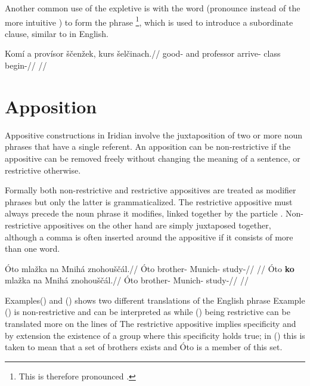 Another common use of the expletive  is with the word  (pronounce  instead of the more intuitive ) to form the phrase \footnote{This is therefore pronounced .}, which is used to introduce a subordinate clause, similar to  in English.

\pex
\a\begingl
    \gla Kom\'i a prov\'isor \v{s}\v{c}en\v{z}ek, kurs \v{s}el\v{c}inach.//
    \glb good- and professor arrive- class begin-//
    \glft {}//
\endgl
\xe

\section{Apposition}\label{sec:apposition}

Appositive constructions in Iridian involve the juxtaposition of two or more noun phrases that have a single referent. An apposition can be non-restrictive if the appositive can be removed freely without changing the meaning of a sentence, or restrictive otherwise.

Formally both non-restrictive and restrictive appositives are treated as modifier phrases but only the latter is grammaticalized. The restrictive appositive must always precede the noun phrase it modifies, linked together by the particle . Non-restrictive appositives on the other hand are simply juxtaposed together, although a comma is often inserted around the appositive if it consists of more than one word.

\pex\a
\begingl{}
    \gla \'Oto mla\v{z}ka na Mnih\'a znohou\v{s}\v{c}\'al.//
    \glb  \'Oto brother-  Munich- study-//
    \glft {}//
\endgl
\a\begingl{}
    \gla \'Oto \textbf{ko} mla\v{z}ka na Mnih\'a znohou\v{s}\v{c}\'al.//
    \glb  \'Oto  brother-  Munich- study-//
    \glft {}//
\endgl
\xe

Examples() and () shows two different translations of the English phrase  Example () is non-restrictive and can be interpreted as  while () being restrictive can be translated more on the lines of  The restrictive appositive implies specificity and by extension the existence of a group where this specificity holds true; in () this is taken to mean that a set of brothers exists and \'Oto is a member of this set.

